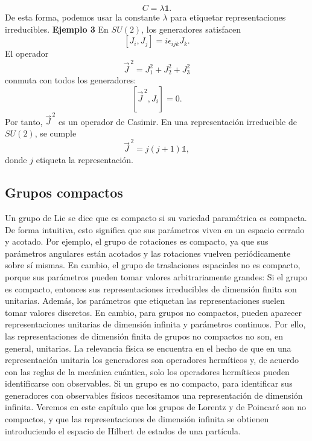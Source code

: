 \documentclass[a4paper,11pt]{book} %
\begin{document}
\begin{equation}
    C = \lambda \mathds{1}.
\end{equation}
\noindent
De esta forma, podemos usar la constante \(\lambda\) para etiquetar representaciones irreducibles.
\medskip\newline
\textbf{Ejemplo 3} 
\medskip\newline\noindent
En \(SU(2)\), los generadores satisfacen
\begin{equation}
    \left[
        J_i,
        J_j
    \right]
    =
    i\epsilon_{ijk}J_k.
\end{equation}
El operador
\begin{equation}
    \vec{J}^{\,2}
    =
    J_1^2 + J_2^2 + J_3^2
\end{equation}
conmuta con todos los generadores:
\begin{equation}
    \left[
        \vec{J}^{\,2},
        J_i
    \right]
    =
    0.
\end{equation}
Por tanto, \(\vec{J}^{\,2}\) es un operador de Casimir. En una representación
irreducible de \(SU(2)\), se cumple
\begin{equation}
    \vec{J}^{\,2}
    =
    j(j+1)\mathds{1},
\end{equation}
donde \(j\) etiqueta la representación.
\subsection{Grupos compactos}
\noindent
Un grupo de Lie se dice que es compacto si su variedad paramétrica es compacta. De
forma intuitiva, esto significa que sus parámetros viven en un espacio cerrado
y acotado.
\medskip\newline
Por ejemplo, el grupo de rotaciones es compacto, ya que sus parámetros
angulares están acotados y las rotaciones vuelven periódicamente sobre sí
mismas. En cambio, el grupo de traslaciones espaciales no es compacto, porque
sus parámetros pueden tomar valores arbitrariamente grandes:
\medskip\newline
Si el grupo es compacto, entonces sus representaciones irreducibles de dimensión
finita son unitarias. Además, los parámetros que etiquetan las representaciones
suelen tomar valores discretos. En cambio, para grupos no compactos, pueden aparecer representaciones
unitarias de dimensión infinita y parámetros continuos. Por ello, las
representaciones de dimensión finita de grupos no compactos no son, en general,
unitarias.
\medskip\newline
La relevancia física se encuentra en el hecho de que en una
representación unitaria los generadores son operadores hermíticos y, de
acuerdo con las reglas de la mecánica cuántica, solo los operadores hermíticos
pueden identificarse con observables. Si un grupo es no compacto, para
identificar sus generadores con observables físicos necesitamos una
representación de dimensión infinita. Veremos en este capítulo que los grupos
de Lorentz y de Poincaré son no compactos, y que las representaciones de
dimensión infinita se obtienen introduciendo el espacio de Hilbert de estados
de una partícula.
\newpage
\end{document}
